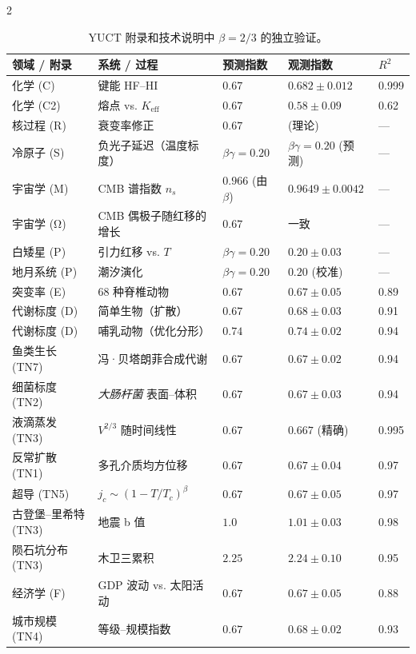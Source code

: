 \documentclass[11pt,a4paper]{article}
\newcommand{\betaf}{\beta}
\begin{document}
\begin{multicols}{2}
		\begin{table}[htbp]
			\centering
			\caption{YUCT 附录和技术说明中 \(\betaf = 2/3\) 的独立验证。}
			\label{tab:full}
			\footnotesize
			\begin{tabular}{p{3.5cm}p{5.0cm}p{2.1cm}p{3.5cm}p{1.4cm}}
				\toprule
				\textbf{领域 / 附录} & \textbf{系统 / 过程} & \textbf{预测指数} & \textbf{观测指数} & \(R^2\) \\
				\midrule
				化学 (C) & 键能 HF–HI & \(0.67\) & \(0.682 \pm 0.012\) & 0.999 \\
				化学 (C2) & 熔点 vs. \(K_{\mathrm{eff}}\) & \(0.67\) & \(0.58 \pm 0.09\) & 0.62 \\
				核过程 (R) & 衰变率修正 & \(0.67\) & (理论) & — \\
				冷原子 (S) & 负光子延迟（温度标度） & \(\beta\gamma = 0.20\) & \(\beta\gamma = 0.20\) (预测) & — \\
				宇宙学 (M) & CMB 谱指数 \(n_s\) & \(0.966\) (由 \(\beta\)) & \(0.9649 \pm 0.0042\) & — \\
				宇宙学 (Ω) & CMB 偶极子随红移的增长 & \(0.67\) & 一致 & — \\
				白矮星 (P) & 引力红移 vs. \(T\) & \(\beta\gamma = 0.20\) & \(0.20 \pm 0.03\) & — \\
				地月系统 (P) & 潮汐演化 & \(\beta\gamma = 0.20\) & \(0.20\) (校准) & — \\
				突变率 (E) & 68 种脊椎动物 & \(0.67\) & \(0.67 \pm 0.05\) & 0.89 \\
				代谢标度 (D) & 简单生物（扩散） & \(0.67\) & \(0.68 \pm 0.03\) & 0.91 \\
				代谢标度 (D) & 哺乳动物（优化分形） & \(0.74\) & \(0.74 \pm 0.02\) & 0.94 \\
				鱼类生长 (TN7) & 冯·贝塔朗菲合成代谢 & \(0.67\) & \(0.67 \pm 0.02\) & 0.94 \\
				细菌标度 (TN2) & \emph{大肠杆菌} 表面–体积 & \(0.67\) & \(0.67 \pm 0.03\) & 0.94 \\
				液滴蒸发 (TN3) & \(V^{2/3}\) 随时间线性 & \(0.67\) & \(0.667\) (精确) & 0.995 \\
				反常扩散 (TN1) & 多孔介质均方位移 & \(0.67\) & \(0.67 \pm 0.04\) & 0.97 \\
				超导 (TN5) & \(j_c \sim (1-T/T_c)^{\beta}\) & \(0.67\) & \(0.67 \pm 0.05\) & 0.97 \\
				古登堡–里希特 (TN3) & 地震 b 值 & \(1.0\) & \(1.01 \pm 0.03\) & 0.98 \\
				陨石坑分布 (TN3) & 木卫三累积 & \(2.25\) & \(2.24 \pm 0.10\) & 0.95 \\
				经济学 (F) & GDP 波动 vs. 太阳活动 & \(0.67\) & \(0.67 \pm 0.05\) & 0.88 \\
				城市规模 (TN4) & 等级–规模指数 & \(0.67\) & \(0.68 \pm 0.02\) & 0.93 \\
				\bottomrule
			\end{tabular}
		\end{table}
		

\end{multicols}
\end{document}
